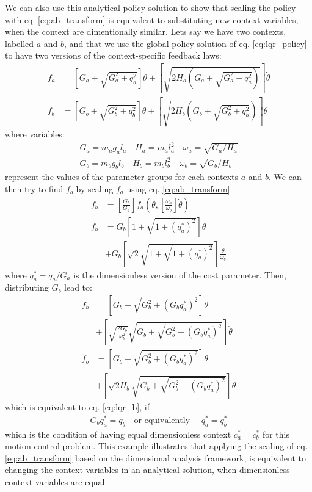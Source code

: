 We can also use this analytical policy solution to show that scaling the policy with eq. \eqref{eq:ab_transform} is equivalent to substituting new context variables, when the context are dimentionally similar. Lets say we have two contexts, labelled $a$ and $b$, and that we use the global policy solution of eq. \eqref{eq:lqr_policy} to have two versions of the context-specific feedback laws:
\begin{align}
f_a &=
\left[ G_a + \sqrt{G_a^2+q_a^2}\right] \theta + \left[\sqrt{2H_a(G_a+\sqrt{G_a^2+q_a^2})}
\right] \dot{\theta} \\
f_b &=
\left[ G_b + \sqrt{G_b^2+q_b^2}\right] \theta + \left[\sqrt{2H_b(G_b+\sqrt{G_b^2+q_b^2})}
\right] \dot{\theta} \label{eq:lqr_b}
\end{align}
where variables:
\begin{align}
G_a=m_a g_a l_a \quad H_a=m_a l_a^2 \quad \omega_a = \sqrt{G_a/H_a} \\
G_b=m_b g_b l_b \quad H_b=m_b l_b^2 \quad \omega_b = \sqrt{G_b/H_b}
\end{align}
represent the values of the parameter groups for each contexts $a$ and $b$. We can then try to find $f_b$ by scaling $f_a$ using eq. \eqref{eq:ab_transform}:
\begin{align}
f_b &= \left[ \frac{G_b}{G_a} \right] f_a \left( \theta , \left[ \frac{\omega_a}{\omega_b} \right] \dot{\theta} \right) 
\\
f_b &= G_b \left[
1 + \sqrt{ 1 + (q_a^*)^2}
\right] \theta
\nonumber \\ & + G_b
\left[
\sqrt{2} \sqrt{ 1 + \sqrt{ 1 + (q_a^*)^2}} \right] \frac{\dot{\theta}}{\omega_b} 
\end{align}
where $q_a^* = q_a / G_a$ is the dimensionless version of the cost parameter. Then, distributing $G_b$ lead to:
\begin{align}
f_b &= \left[
G_b + \sqrt{ G_b^2 + (G_b q_a^*)^2}
\right] \theta
\nonumber \\ & +
\left[
\sqrt{\frac{2G_b}{\omega_b^2}} \sqrt{ G_b + \sqrt{ G_b^2 + (G_b q_a^*)^2}} \right] \dot{\theta}
\\
f_b &= \left[
G_b + \sqrt{ G_b^2 + (G_b q_a^*)^2}
\right] \theta
\nonumber \\ & +
\left[
\sqrt{2 H_b} \sqrt{ G_b + \sqrt{ G_b^2 + (G_b q_a^*)^2}} \right] \dot{\theta}
\end{align}
which is equivalent to eq. \eqref{eq:lqr_b}, if 
\begin{align}
G_b q_a^* = q_b \quad \text{or equivalently } \quad q_a^* = q_b^*
\end{align}
which is the condition of having equal dimensionless context $c_a^* = c_b^*$ for this motion control problem. This example illustrates that applying the scaling of eq. \eqref{eq:ab_transform} based on the dimensional analysis framework, is equivalent to changing the context variables in an analytical solution, when dimensionless context variables are equal.

